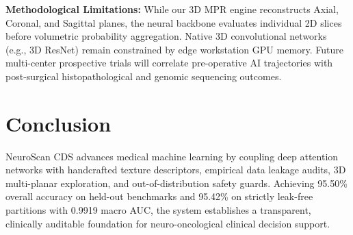 \documentclass[journal,twocolumn,10pt]{IEEEtran}
\begin{document}
\textbf{Methodological Limitations:} While our 3D MPR engine reconstructs Axial, Coronal, and Sagittal planes, the neural backbone evaluates individual 2D slices before volumetric probability aggregation. Native 3D convolutional networks (e.g., 3D ResNet) remain constrained by edge workstation GPU memory. Future multi-center prospective trials will correlate pre-operative AI trajectories with post-surgical histopathological and genomic sequencing outcomes.

\section{Conclusion}
NeuroScan CDS advances medical machine learning by coupling deep attention networks with handcrafted texture descriptors, empirical data leakage audits, 3D multi-planar exploration, and out-of-distribution safety guards. Achieving 95.50\% overall accuracy on held-out benchmarks and 95.42\% on strictly leak-free partitions with 0.9919 macro AUC, the system establishes a transparent, clinically auditable foundation for neuro-oncological clinical decision support.
\end{document}
